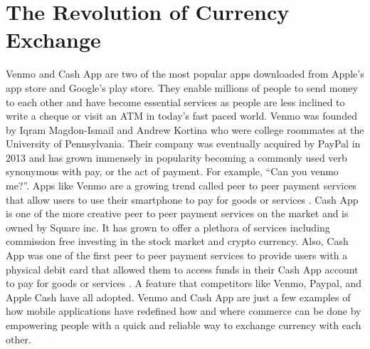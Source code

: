 \documentclass{article}
\begin{document}
\section{The Revolution of Currency Exchange}
Venmo and Cash App are two of the most popular apps downloaded from Apple's app store and Google's play store. They enable millions of people to send money to each other and have become essential services as people are less inclined to write a cheque or visit an ATM in today's fast paced world. Venmo was founded by Iqram Magdon-Ismail and Andrew Kortina who were college roommates at the University of Pennsylvania. Their company was eventually acquired by PayPal in 2013 and has grown immensely in popularity becoming a commonly used verb synonymous with pay, or the act of payment. For example, “Can you venmo me?”.  Apps like Venmo are a growing trend called peer to peer payment services that allow users to use their smartphone to pay for goods or services \cite{bloomenthal_2020}. Cash App is one of the more creative peer to peer payment services on the market and is owned by Square inc. It has grown to offer a plethora of services including commission free investing in the stock market and crypto currency. Also, Cash App was one of the first peer to peer payment services to provide users with a physical debit card that allowed them to access funds in their Cash App account to pay for goods or services \cite{eckstein_2020}. A feature that competitors like Venmo, Paypal, and Apple Cash have all adopted. Venmo and Cash App are just a few examples of how mobile applications have redefined how and where commerce can be done by empowering people with a quick and reliable way to exchange currency with each other.
\end{document}
